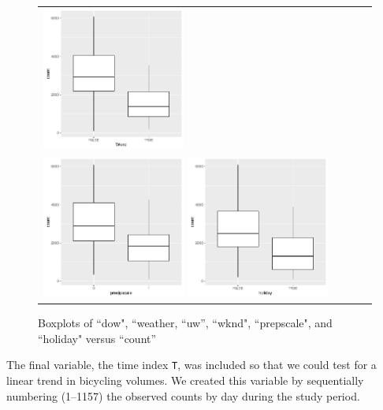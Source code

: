 \documentclass [11pt, proquest] {uwthesis}[2015/03/03]
\begin{document}
\begin{figure}
\begin{tabular}{ll}
\includegraphics[width=0.45\textwidth]{figures/wknd_cat}\\
\includegraphics[width=0.45\textwidth]{figures/scale_cat}
\includegraphics[width=0.45\textwidth]{figures/holiday_cat}\\
\end{tabular}
\vspace{-10pt}
\caption{Boxplots of ``dow", ``weather, ``uw'', ``wknd", ``prepscale", and ``holiday"  versus ``count''}
\label{fig:cat_bxplot}
\end{figure}

The final variable, the time index \texttt{T}, was included so that we could test for a linear trend in bicycling volumes. We created this variable by sequentially numbering (1--1157) the observed counts by day during the study period.
\end{document}
